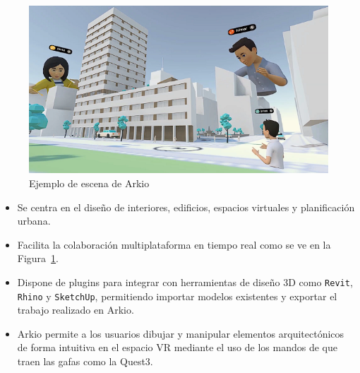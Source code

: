 \documentclass[a4paper, 12pt]{book}
\begin{document}
\begin{figure}[H]  %
  \centering
  \includegraphics[width=0.8\linewidth]{img/arkio.png}  %
  \caption{Ejemplo de escena de Arkio}  %
  \label{fig:arkio}  %
\end{figure}

\begin{itemize}
  \item Se centra en el diseño de interiores, edificios, espacios virtuales y planificación urbana. 
  \item Facilita la colaboración multiplataforma en tiempo real como se ve en la Figura~\ref{fig:arkio}.
  \item Dispone de plugins para integrar con herramientas de diseño 3D como \texttt{Revit}, \texttt{Rhino} y \texttt{SketchUp}, permitiendo importar modelos existentes y exportar el trabajo realizado en Arkio.
  \item Arkio permite a los usuarios dibujar y manipular elementos arquitectónicos de forma intuitiva en el espacio VR mediante el uso de los mandos de que traen las gafas como la Quest3.
\end{itemize}
\end{document}
